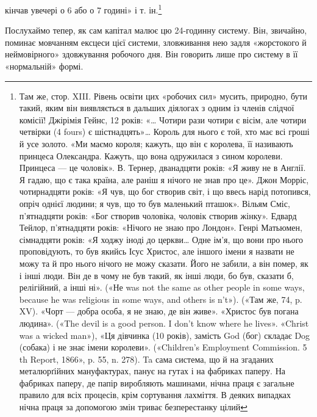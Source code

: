 кінчав увечері о 6 або о 7 годині» і т. ін.\footnote{
Там же, стор. XIII. Рівень освіти цих «робочих сил» мусить, природно,
бути такий, яким він виявляється в дальших діялогах з одним із
членів слідчої комісії! Джірімія Гейнс, 12 років: «\dots{} Чотири рази чотири
є вісім, але чотири четвірки (4 fours) є шістнадцять»\dots{} Король для
нього є той, хто має всі гроші й усе золото. «Ми маємо короля; кажуть,
що він є королева, її називають принцеса Олександра. Кажуть, що вона
одружилася з сином королеви. Принцеса — це чоловік». В. Тернер,
дванадцяти років: «Я живу не в Англії. Я гадаю, що є така країна, але
раніш я нічого не знав про це». Джон Морріс, чотирнадцяти років: «Я чув,
що бог створив світ, і що ввесь нарід потопився, опріч однієї людини; я
чув, що то був маленький пташок». Вільям Сміс, п’ятнадцяти років:
«Бог створив чоловіка, чоловік створив жінку». Едвард Тейлор, п’ятнадцяти
років: «Нічого не знаю про Лондон». Генрі Матьюмен, сімнадцяти
років: «Я ходжу іноді до церкви\dots{} Одне ім’я, що вони про нього проповідують,
то був якийсь Ісус Христос, але іншого імени я назвати не можу
та й про нього нічого не можу сказати. Його не забили, а він помер, як
і інші люди. Він де в чому не був такий, як інші люди, бо був, сказати б,
релігійний, а інші ні». («Не was not the same as other people in some ways,
because he was religious in some ways, and others is n’t»). («Там же, 74,
p. XV). «Чорт — добра особа, я не знаю, де він живе». «Христос був погана
людина». («The devil is a good person. I don’t know where he lives». «Christ
was a wicked man»), «Ця дівчинка (10 років), замість God (бог) складає
Dog (собака) і не знає імени королеви». («Children’s Employment Commission.
5 th Report, 1866», p. 55, n. 278). Ta сама система, що й на згаданих
металюрґійних мануфактурах, панує на гутах і на фабриках паперу.
На фабриках паперу, де папір виробляють машинами, нічна праця
є загальне правило для всіх процесів, крім сортування лахміття. В деяких
випадках нічна праця за допомогою змін триває безперестанку цілий
}

Послухаймо тепер, як сам капітал малює цю 24-годинну
систему. Він, звичайно, поминає мовчанням ексцеси цієї системи,
зловживання нею задля «жорстокого й неймовірного» здовжування
робочого дня. Він говорить лише про систему в її «нормальній»
формі.

